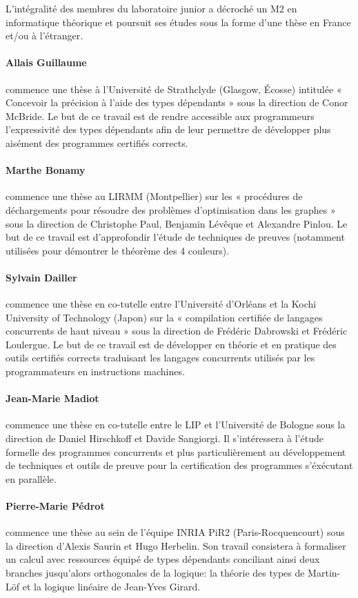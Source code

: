 
L'intégralité des membres du laboratoire junior a décroché un M2
en informatique théorique et poursuit ses études sous la forme
d'une thèse en France et/ou à l'étranger.

\paragraph{Allais Guillaume} commence une thèse à l'Université de
Strathclyde (Glasgow, Écosse) intitulée « Concevoir la précision
à l'aide des types dépendants » sous la direction de Conor McBride.
Le but de ce travail est de rendre accessible aux programmeurs
l'expressivité des types dépendants afin de leur permettre de
développer plus aisément des programmes certifiés corrects.

\paragraph{Marthe Bonamy} commence une thèse au LIRMM (Montpellier)
sur les « procédures de déchargements pour résoudre des problèmes
d'optimisation dans les graphes » sous la direction de Christophe
Paul, Benjamin Lévêque et Alexandre Pinlou.
Le but de ce travail est d'approfondir l'étude de techniques de
preuves (notamment utilisées pour démontrer le théorème des 4 couleurs).

\paragraph{Sylvain Dailler} commence une thèse en co-tutelle entre
l'Université d'Orléans et la Kochi University of Technology (Japon)
sur la « compilation certifiée de langages concurrents de haut niveau »
sous la direction de Frédéric Dabrowski et Frédéric Loulergue.
Le but de ce travail est de développer en théorie et en pratique des
outils certifiés corrects traduisant les langages concurrents utilisés
par les programmateurs en instructions machines.

\paragraph{Jean-Marie Madiot} commence une thèse en co-tutelle entre
le LIP et l'Université de Bologne sous la direction de Daniel Hirschkoff
et Davide Sangiorgi. Il s'intéressera à l'étude formelle des programmes
concurrents et plus particulièrement au développement de techniques et
outils de preuve pour la certification des programmes s'éxécutant en
parallèle.

\paragraph{Pierre-Marie Pédrot} commence une thèse au sein de l'équipe
INRIA PiR2 (Paris-Rocquencourt) sous la direction d'Alexis Saurin et Hugo
Herbelin. Son travail consistera à formaliser un  calcul avec ressources
équipé de types dépendants conciliant ainsi deux branches jusqu'alors
orthogonales de la logique: la théorie des types de Martin-Löf et la logique
linéaire de Jean-Yves Girard.

